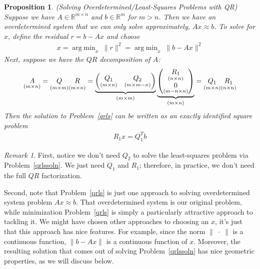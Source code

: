 \documentclass[12pt]{book}
\numberwithin{equation}{section} %
\theoremstyle{plain}
\newtheorem{prop}[thm]{Proposition}
\theoremstyle{definition}
\theoremstyle{remark}
\newtheorem*{rmk}{Remark}
\newcommand{\Rm}{\mathbb{R}^m}
\newcommand{\Rmn}{\mathbb{R}^{m\times n}}
\DeclareMathOperator*{\argmin}{arg\;min}
\begin{document}
\clearpage
\begin{prop}
\emph{(Solving Overdetermined/Least-Squares Problems with QR)}
Suppose we have $A\in\Rmn$ and $b\in\Rm$ for $m>n$.
Then we have an overdetermined system that we can only solve
approximately, $Ax\approx b$. To solve for $x$,
define the residual $r=b-Ax$ and choose
\begin{align}
  x = \argmin_x \;\lVert r\rVert^2 =
  \argmin_x \;\lVert b-Ax\rVert^2
  \label{qrls}
\end{align}
Next, suppose we have the $QR$ decomposition of $A$:
\begin{align*}
  \underset{(m\times n)}{A}
  =
  \underset{(m\times m)}{Q}
  \underset{(m\times n)}{R\vphantom{Q}}
  =
  \underbrace{%
    \begin{pmatrix}
      \underset{(m\times n)}{Q_1}
      & \underset{(m\times m-n)}{Q_2}
    \end{pmatrix}
  }_{(m\times m)}
  \underbrace{%
    \begin{pmatrix}
      \underset{(n\times n)}{R_1}
      \\
      \underset{(m-n\times n)}{0}
    \end{pmatrix}
  }_{(m\times n)}
  =
  \underset{(m\times n)}{Q_1}
  \underset{(n\times n)}{R_1\vphantom{Q_1}}
\end{align*}
Then the solution to Problem~\ref{qrls} can be written as an exactly
identified square problem
\begin{align}
  R_1 x = Q_1^T b
  \label{qrlssoln}
\end{align}
\end{prop}
\begin{rmk}
First, notice we don't need $Q_2$ to solve the least-squares problem via
Problem~\ref{qrlssoln}. We just need $Q_1$ and $R_1$; therefore, in
practice, we don't need the full $QR$ factorization.

Second, note that Problem~\ref{qrls} is just one approach to solving
overdetermined system problem $Ax\approx b$. That overdetermined system
is our original problem, while minimization Problem~\ref{qrls} is simply
a particularly attractive approach to tackling it. We might have chosen
other approaches to choosing an $x$, it's just that this approach has
nice features. For example, since the norm $\lVert\;\cdot\;\rVert$ is a
continuous function, $\lVert b-Ax\lVert$ is a continuous function of
$x$. Moreover, the resulting solution that comes out of solving
Problem~\ref{qrlssoln} has nice geometric properties, as we will discuss
below.
\end{rmk}
\end{document}
